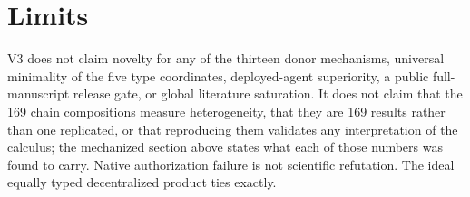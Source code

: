 \section{Limits}

V3 does not claim novelty for any of the thirteen donor mechanisms, universal minimality of the five type coordinates, deployed-agent superiority, a public full-manuscript release gate, or global literature saturation. It does not claim that the 169 chain compositions measure heterogeneity, that they are 169 results rather than one replicated, or that reproducing them validates any interpretation of the calculus; the mechanized section above states what each of those numbers was found to carry. Native authorization failure is not scientific refutation. The ideal equally typed decentralized product ties exactly.
